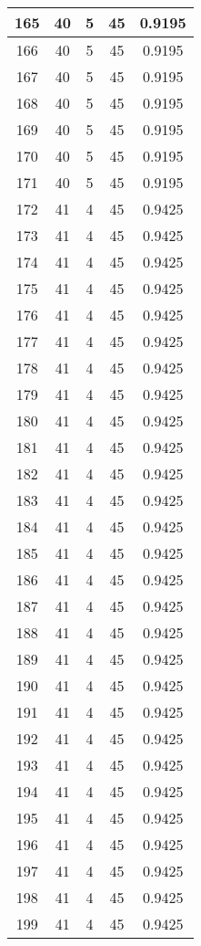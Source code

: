 \documentclass[letterpaper, 12pt]{article}
\begin{document}
\begin{longtable}{|c|c|c|c|c|}
\hline
165 & 40 & 5 & 45 & 0.9195 \\
\hline
166 & 40 & 5 & 45 & 0.9195 \\
\hline
167 & 40 & 5 & 45 & 0.9195 \\
\hline
168 & 40 & 5 & 45 & 0.9195 \\
\hline
169 & 40 & 5 & 45 & 0.9195 \\
\hline
170 & 40 & 5 & 45 & 0.9195 \\
\hline
171 & 40 & 5 & 45 & 0.9195 \\
\hline
172 & 41 & 4 & 45 & 0.9425 \\
\hline
173 & 41 & 4 & 45 & 0.9425 \\
\hline
174 & 41 & 4 & 45 & 0.9425 \\
\hline
175 & 41 & 4 & 45 & 0.9425 \\
\hline
176 & 41 & 4 & 45 & 0.9425 \\
\hline
177 & 41 & 4 & 45 & 0.9425 \\
\hline
178 & 41 & 4 & 45 & 0.9425 \\
\hline
179 & 41 & 4 & 45 & 0.9425 \\
\hline
180 & 41 & 4 & 45 & 0.9425 \\
\hline
181 & 41 & 4 & 45 & 0.9425 \\
\hline
182 & 41 & 4 & 45 & 0.9425 \\
\hline
183 & 41 & 4 & 45 & 0.9425 \\
\hline
184 & 41 & 4 & 45 & 0.9425 \\
\hline
185 & 41 & 4 & 45 & 0.9425 \\
\hline
186 & 41 & 4 & 45 & 0.9425 \\
\hline
187 & 41 & 4 & 45 & 0.9425 \\
\hline
188 & 41 & 4 & 45 & 0.9425 \\
\hline
189 & 41 & 4 & 45 & 0.9425 \\
\hline
190 & 41 & 4 & 45 & 0.9425 \\
\hline
191 & 41 & 4 & 45 & 0.9425 \\
\hline
192 & 41 & 4 & 45 & 0.9425 \\
\hline
193 & 41 & 4 & 45 & 0.9425 \\
\hline
194 & 41 & 4 & 45 & 0.9425 \\
\hline
195 & 41 & 4 & 45 & 0.9425 \\
\hline
196 & 41 & 4 & 45 & 0.9425 \\
\hline
197 & 41 & 4 & 45 & 0.9425 \\
\hline
198 & 41 & 4 & 45 & 0.9425 \\
\hline
199 & 41 & 4 & 45 & 0.9425 \\
\hline
\end{longtable}
\end{document}
